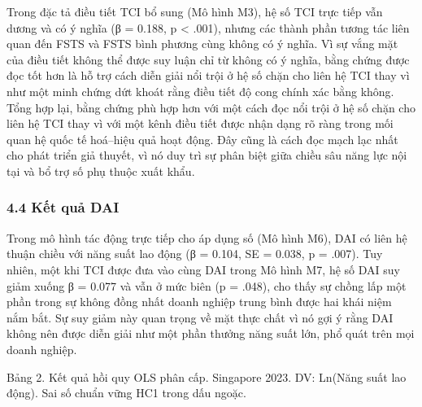 \documentclass[12pt,a4paper]{article}
\begin{document}
Trong đặc tả điều tiết TCI bổ sung (Mô hình M3), hệ số TCI trực tiếp vẫn
dương và có ý nghĩa (β = 0.188, p \textless{} .001), nhưng các thành
phần tương tác liên quan đến FSTS và FSTS bình phương cùng không có ý
nghĩa. Vì sự vắng mặt của điều tiết không thể được suy luận chỉ từ không
có ý nghĩa, bằng chứng được đọc tốt hơn là hỗ trợ cách diễn giải nổi
trội ở hệ số chặn cho liên hệ TCI thay vì như một minh chứng dứt khoát
rằng điều tiết độ cong chính xác bằng không. Tổng hợp lại, bằng chứng
phù hợp hơn với một cách đọc nổi trội ở hệ số chặn cho liên hệ TCI thay
vì với một kênh điều tiết được nhận dạng rõ ràng trong mối quan hệ quốc
tế hoá--hiệu quả hoạt động. Đây cũng là cách đọc mạch lạc nhất cho phát
triển giả thuyết, vì nó duy trì sự phân biệt giữa chiều sâu năng lực nội
tại và bổ trợ số phụ thuộc xuất khẩu.

\hypertarget{44-kux1ebft-quux1ea3-dai}{%
\subsubsection{4.4 Kết quả DAI}\label{44-kux1ebft-quux1ea3-dai}}

Trong mô hình tác động trực tiếp cho áp dụng số (Mô hình M6), DAI có
liên hệ thuận chiều với năng suất lao động (β = 0.104, SE = 0.038, p =
.007). Tuy nhiên, một khi TCI được đưa vào cùng DAI trong Mô hình M7, hệ
số DAI suy giảm xuống β = 0.077 và vẫn ở mức biên (p = .048), cho thấy
sự chồng lấp một phần trong sự không đồng nhất doanh nghiệp trung bình
được hai khái niệm nắm bắt. Sự suy giảm này quan trọng về mặt thực chất
vì nó gợi ý rằng DAI không nên được diễn giải như một phần thưởng năng
suất lớn, phổ quát trên mọi doanh nghiệp.

Bảng 2. Kết quả hồi quy OLS phân cấp. Singapore 2023. DV: Ln(Năng suất
lao động). Sai số chuẩn vững HC1 trong dấu ngoặc.
\end{document}
